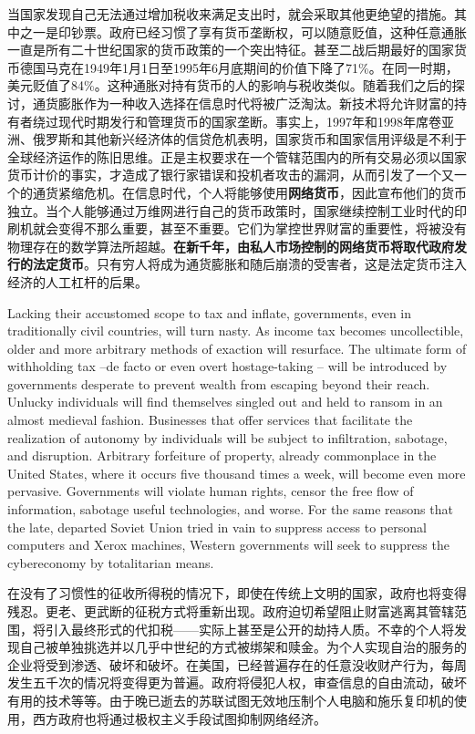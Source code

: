 \begin{paracol}{2}[]
\switchcolumn
当国家发现自己无法通过增加税收来满足支出时，就会采取其他更绝望的措施。其中之一是印钞票。政府已经习惯了享有货币垄断权，可以随意贬值，这种任意通胀一直是所有二十世纪国家的货币政策的一个突出特征。甚至二战后期最好的国家货币德国马克在1949年1月1日至1995年6月底期间的价值下降了71\%。在同一时期，美元贬值了84\%。这种通胀对持有货币的人的影响与税收类似。随着我们之后的探讨，通货膨胀作为一种收入选择在信息时代将被广泛淘汰。新技术将允许财富的持有者绕过现代时期发行和管理货币的国家垄断。事实上，1997年和1998年席卷亚洲、俄罗斯和其他新兴经济体的信贷危机表明，国家货币和国家信用评级是不利于全球经济运作的陈旧思维。正是主权要求在一个管辖范围内的所有交易必须以国家货币计价的事实，才造成了银行家错误和投机者攻击的漏洞，从而引发了一个又一个的通货紧缩危机。在信息时代，个人将能够使用\textbf{网络货币}，因此宣布他们的货币独立。当个人能够通过万维网进行自己的货币政策时，国家继续控制工业时代的印刷机就会变得不那么重要，甚至不重要。它们为掌控世界财富的重要性，将被没有物理存在的数学算法所超越。\textbf{在新千年，由私人市场控制的网络货币将取代政府发行的法定货币}。只有穷人将成为通货膨胀和随后崩溃的受害者，这是法定货币注入经济的人工杠杆的后果。

\switchcolumn*
Lacking their accustomed scope to tax and inflate, governments, even in traditionally civil countries, will turn nasty. As income tax becomes uncollectible, older and more arbitrary methods of exaction will resurface. The ultimate form of withholding tax --de facto or even overt hostage-taking -- will be introduced by governments desperate to prevent wealth from escaping beyond their reach. Unlucky individuals will find themselves singled out and held to ransom in an almost medieval fashion. Businesses that offer services that facilitate the realization of autonomy by individuals will be subject to infiltration, sabotage, and disruption. Arbitrary forfeiture of property, already commonplace in the United States, where it occurs five thousand times a week, will become even more pervasive. Governments will violate human rights, censor the free flow of information, sabotage useful technologies, and worse. For the same reasons that the late, departed Soviet Union tried in vain to suppress access to personal computers and Xerox machines, Western governments will seek to suppress the cybereconomy by totalitarian means.

\switchcolumn
在没有了习惯性的征收所得税的情况下，即使在传统上文明的国家，政府也将变得残忍。更老、更武断的征税方式将重新出现。政府迫切希望阻止财富逃离其管辖范围，将引入最终形式的代扣税——实际上甚至是公开的劫持人质。不幸的个人将发现自己被单独挑选并以几乎中世纪的方式被绑架和赎金。为个人实现自治的服务的企业将受到渗透、破坏和破坏。在美国，已经普遍存在的任意没收财产行为，每周发生五千次的情况将变得更为普遍。政府将侵犯人权，审查信息的自由流动，破坏有用的技术等等。由于晚已逝去的苏联试图无效地压制个人电脑和施乐复印机的使用，西方政府也将通过极权主义手段试图抑制网络经济。

\end{paracol}


